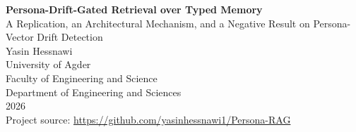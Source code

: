 \begin{titlepage}
  \centering
  \vspace*{2cm}

  {\Large\textbf{Persona-Drift-Gated Retrieval over Typed Memory}}\\[0.5cm]
  {\large A Replication, an Architectural Mechanism, and a Negative Result on Persona-Vector Drift Detection}\\[2cm]

  {\large Yasin Hessnawi}\\[2cm]

  University of Agder\\
  Faculty of Engineering and Science\\
  Department of Engineering and Sciences\\[3cm]

  2026\\
  \vfill
  {\small Project source: \url{https://github.com/yasinhessnawi1/Persona-RAG}}
\end{titlepage}

